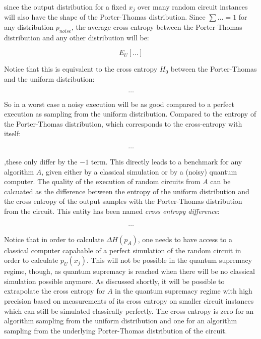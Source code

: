 since the output distribution for a fixed $x_j$ over many random circuit
instances will also have the shape of the Porter-Thomas distribution.
Since $\sum \dots = 1$ for any distribution $p_{noise}$, the average cross
entropy between the Porter-Thomas distribution and any other distribution will be:

\begin{equation}
  E_U [\dots]
\end{equation}

Notice that this is equivalent to the cross entropy $H_0$ between the
Porter-Thomas and the uniform distribution:

\begin{equation}
  \dots
\end{equation}


So in a worst case a noisy execution will be as good compared to a perfect
execution as sampling from the uniform distribution. Compared to the entropy of
the Porter-Thomas distribution, which corresponds to the cross-entropy with
itself:

\begin{align}
  \dots
\end{align}

,these only differ by the $-1$ term. 
This directly leads to a benchmark for any algorithm $A$, given either by a
classical simulation or by a (noisy) quantum computer. The quality of the
execution of random circuits from $A$ can be calcuated as the difference between
the entropy of the uniform distribution and the cross entropy of the output
samples with the Porter-Thomas distribution from the circuit. This entity has
been named \textit{cross entropy difference}:

\begin{align}
  \dots
\end{align}

Notice that in order to calculate $\Delta H(p_A)$, one needs to have access to a
classical computer capabable of a perfect simulation of the random circuit in
order to calculate $p_U(x_j)$. This will not be possible in the quantum
supremacy regime, though, as quantum supremacy is reached when there will be no
classical simulation possible anymore. As discussed shortly, it will be possible
to extrapolate the cross entropy for $A$ in the quantum supremacy regime with high
precision based on measurements of its cross entropy on smaller circuit
instances which can still be simulated classically perfectly.
The cross entropy is zero for an algorithm sampling from the uniform
distribution and one for an algorithm sampling from the underlying Porter-Thomas
distribution of the circuit.

